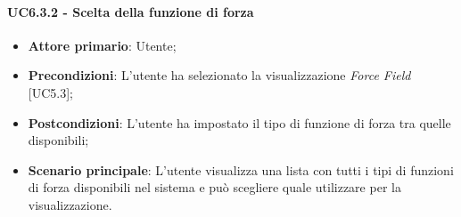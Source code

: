 \paragraph{UC6.3.2 - Scelta della funzione di forza}
\begin{itemize}
	\item \textbf{Attore primario}: Utente;
	\item \textbf{Precondizioni}: L'utente ha selezionato la visualizzazione \textit{Force Field} [UC5.3];
	\item \textbf{Postcondizioni}: L'utente ha impostato il tipo di funzione di forza tra quelle disponibili;
	
	\item \textbf{Scenario principale}: L'utente visualizza una lista con tutti i tipi di funzioni di forza disponibili nel sistema e può scegliere quale utilizzare per la visualizzazione.
\end{itemize}